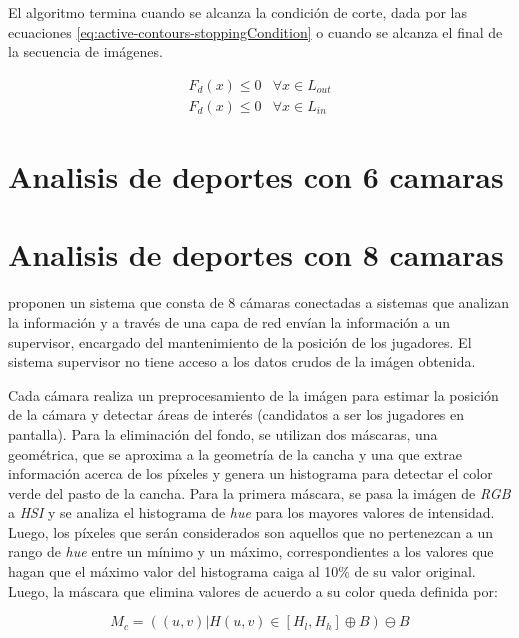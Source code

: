 \documentclass[a4paper,10pt]{article}
\begin{document}
El algoritmo termina cuando se alcanza la condición de corte, dada por las ecuaciones \ref{eq:active-contours-stoppingCondition} o cuando se alcanza el final de 
la secuencia de imágenes.

\begin{equation}
\label{eq:active-contours-stoppingCondition}
    \begin{array}{ll}
        F_{d}(x) \leq 0 & \forall x \in L_{out}\\
        F_{d}(x) \leq 0 & \forall x \in L_{in}
    \end{array} 
\end{equation}

\section{Analisis de deportes con 6 camaras}
\label{sec:6-camaras}


\section{Analisis de deportes con 8 camaras}
\label{sec:8-camaras}

\citeauthor*{xu-8cams} proponen un sistema que consta de 8 cámaras conectadas a
sistemas que analizan la información y a través de una capa de red envían la
información a un supervisor, encargado del mantenimiento de la posición de los
jugadores. El sistema supervisor no tiene acceso a los datos crudos de la
imágen obtenida.

Cada cámara realiza un preprocesamiento de la imágen para estimar la posición
de la cámara y detectar áreas de interés (candidatos a ser los jugadores en
pantalla). Para la eliminación del fondo, se utilizan dos máscaras, una
geométrica, que se aproxima a la geometría de la cancha y una que extrae
información acerca de los píxeles y genera un histograma para detectar el color
verde del pasto de la cancha. Para la primera máscara, se pasa la imágen de
\textit{RGB} a \textit{HSI} y se analiza el histograma de \textit{hue} para los
mayores valores de intensidad. Luego, los píxeles que serán considerados son
aquellos que no pertenezcan a un rango de \textit{hue} entre un mínimo y un
máximo, correspondientes a los valores que hagan que el máximo valor del
histograma caiga al 10\% de su valor original.  Luego, la máscara que elimina
valores de acuerdo a su color queda definida por:

\[
  M_c = ({(u, v) | H(u, v) \in [H_l, H_h]} \oplus B ) \ominus B
\]
\end{document}
